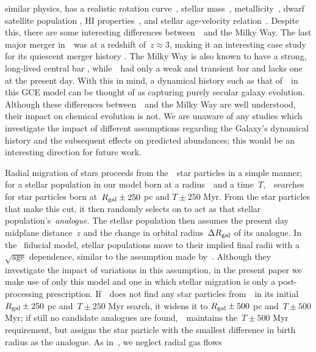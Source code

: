 \documentclass[ms.tex]{subfiles}
\begin{document}
similar physics, has a realistic rotation curve~\citep{Governato2012,
Christensen2014a, Christensen2014b}, stellar mass~\citep{Munshi2013},
metallicity~\citep{Christensen2016}, dwarf satellite population
\citep{Zolotov2012, Brooks2014}, HI properties~\citep{Brooks2017}, and stellar
age-velocity relation~\citep{Bird2021}.
Despite this, there are some interesting differences between~\hsim~and the
Milky Way.
The last major merger in~\hsim~was at a redshift of~$z \approx 3$, making it an
interesting case study for its quiescent merger history
\citep[e.g.][]{Zolotov2012}.
The Milky Way is also known to have a strong, long-lived central bar
\citep[e.g.][]{Bovy2019}, while~\hsim~had only a weak and transient bar and
lacks one at the present day.
With this in mind, a dynamical history such as that of~\hsim~in this GCE model
can be thought of as capturing purely secular galaxy evolution.
Although these differences between~\hsim~and the Milky Way are well understood,
their impact on chemical evolution is not.
We are unaware of any studies which investigate the impact of different
assumptions regarding the Galaxy's dynamical history and the subsequent effects
on predicted abundances; this would be an interesting direction for future work.
\par
Radial migration of stars proceeds from the~\hsim~star particles in a simple
manner; for a stellar population in our model born at a radius~\rgal~and a
time~$T$,~\vice~searches for star particles born at~$R_\text{gal} \pm 250$ pc and
$T \pm 250$ Myr.
From the star particles that make this cut, it then randomly selects on to act
as that stellar population's~\textit{analogue}.
The stellar population then assumes the present day midplane distance~$z$ and
the change in orbital radius~$\Delta R_\text{gal}$ of its analogue.
In the~\citet{Johnson2021} fiducial model, stellar populations move to their
implied final radii with a~$\sqrt{\text{age}}$ dependence, similar to the
assumption made by~\citet{Frankel2018, Frankel2019}.
Although they investigate the impact of variations in this assumption, in the
present paper we make use of only this model and one in which stellar migration
is only a post-processing prescription.
If~\vice~does not find any star particles from~\hsim~in its initial
$R_\text{gal} \pm 250$ pc and~$T \pm 250$ Myr search, it widens it to
$R_\text{gal} \pm 500$ pc and~$T \pm 500$ Myr; if still no candidate analogues are
found,~\vice~maintains the~$T \pm 500$ Myr requirement, but assigns the star
particle with the smallest difference in birth radius as the analogue.
As in~\citet{Johnson2021}, we neglect radial gas flows
\end{document}

